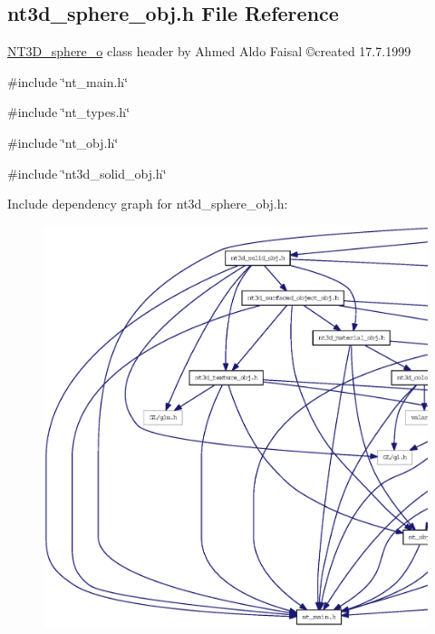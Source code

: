 \subsection{nt3d\_\-sphere\_\-obj.h File Reference}
\label{nt3d__sphere__obj_8h}



\begin{DoxyItemize}
\item \hyperlink{class_n_t3_d__sphere__o}{NT3D\_\-sphere\_\-o} class header by Ahmed Aldo Faisal \copyright created 17.7.1999 
\end{DoxyItemize} 


{\ttfamily \#include \char`\"{}nt\_\-main.h\char`\"{}}\par
{\ttfamily \#include \char`\"{}nt\_\-types.h\char`\"{}}\par
{\ttfamily \#include \char`\"{}nt\_\-obj.h\char`\"{}}\par
{\ttfamily \#include \char`\"{}nt3d\_\-solid\_\-obj.h\char`\"{}}\par
Include dependency graph for nt3d\_\-sphere\_\-obj.h:
\nopagebreak
\begin{figure}[H]
\begin{center}
\leavevmode
\includegraphics[width=400pt]{nt3d__sphere__obj_8h__incl}
\end{center}
\end{figure}
